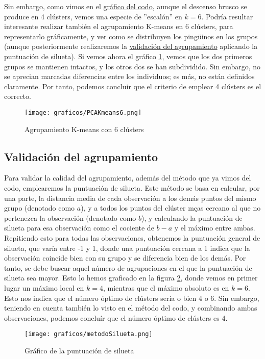 \documentclass[a4paper,onecolumn]{extarticle}
\begin{document}
\begin{sloppypar}
Sin embargo, como vimos en el \hyperref[fig:metodoCodo]{gráfico del codo}, aunque el descenso brusco se produce en 4 clústers, vemos una especie de ''escalón'' 
en $k=6$. Podría resultar interesante realizar también el agrupamiento K-means en 6 clústers, para representarlo gráficamente, y ver como se distribuyen los 
pingüinos en los grupos (aunque posteriormente realizaremos la \hyperref[validacion]{validación del agrupamiento} aplicando la puntuación de silueta). Si vemos 
ahora el gráfico \ref{fig:KMEANS6}, vemos que los dos primeros grupos se mantienen intactos, y los otros dos se han subdividido. Sin embargo, no se aprecian 
marcadas diferencias entre los individuos; es más, no están definidos claramente. Por tanto, podemos concluir que el criterio de emplear 4 clústers es el correcto.
\begin{center}
    \begin{figure}[h!]
        \centering
        \texttt{[image: graficos/PCAKmeans6.png]}
        \caption{Agrupamiento K-means con 6 clústers}
        \label{fig:KMEANS6}
    \end{figure}
\end{center}

\subsection{Validación del agrupamiento} \label{validacion}
Para validar la calidad del agrupamiento, además del método que ya vimos del codo, emplearemos la puntuación de silueta. Este método se basa en calcular, por 
una parte, la distancia media de cada observación a los demás puntos del mismo grupo (denotado como $a$), y a todos los puntos del clúster mças cercano al que 
no pertenezca la observación (denotado como $b$), y calculando la puntuación de silueta para esa observación como el cociente de $b-a$ y el máximo entre ambas. 
Repitiendo esto para todas las observaciones, obtenemos la puntuación general de silueta, que varía entre -1 y 1, donde una puntuación cercana a 1 indica que 
la observación coincide bien con su grupo y se diferencia bien de los demás. Por tanto, se debe buscar aquel número de agrupaciones en el que la puntuación 
de silueta sea mayor. Esto lo hemos graficado en la figura \ref{fig:silueta}, donde vemos en primer lugar un máximo local en $k=4$, mientras que el máximo 
absoluto es en $k=6$. Esto nos indica que el número óptimo de clústers sería o bien 4 o 6. Sin embargo, teniendo en cuenta también lo visto en el método del 
codo, y combinando ambas observaciones, podemos concluír que el número óptimo de clústers es 4.
\begin{center}
    \begin{figure}[h!]
        \centering
        \texttt{[image: graficos/metodoSilueta.png]}
        \caption{Gráfico de la puntuación de silueta}
        \label{fig:silueta}
    \end{figure}
\end{center}


\end{sloppypar}
\end{document}
